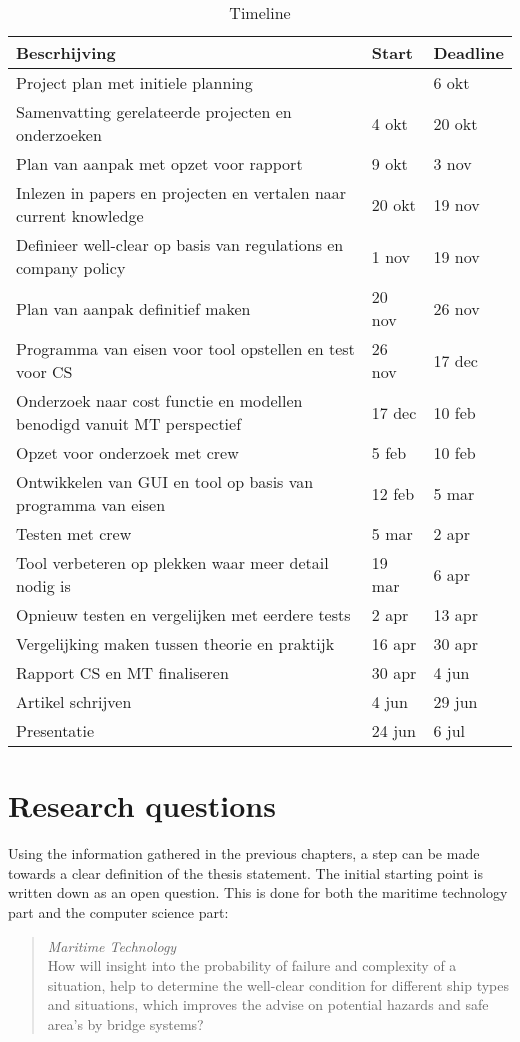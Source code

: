 \begin{table}[h]
	\centering
	\caption{Timeline}
	\label{tab:timeline-project}
	\begin{tabular}{l||l|l}
		Bescrhijving & Start & Deadline \\ \hline \hline
		Project plan met initiele planning &  & 6 okt \\ \hline
		Samenvatting gerelateerde projecten en onderzoeken & 4 okt & 20 okt \\ \hline
		Plan van aanpak met opzet voor rapport & 9 okt & 3 nov \\ \hline
		Inlezen in papers en projecten en vertalen naar current knowledge & 20 okt & 19 nov \\ \hline
		Definieer well-clear op basis van regulations en company policy & 1 nov & 19 nov \\ \hline
		Plan van aanpak definitief maken & 20 nov & 26 nov \\ \hline
		Programma van eisen voor tool opstellen en test voor CS & 26 nov & 17 dec \\ \hline
		Onderzoek naar cost functie en modellen benodigd vanuit MT perspectief & 17 dec & 10 feb \\ \hline
		Opzet voor onderzoek met crew & 5 feb & 10 feb \\ \hline
		Ontwikkelen van GUI en tool op basis van programma van eisen & 12 feb & 5 mar \\ \hline
		Testen met crew & 5 mar & 2 apr \\ \hline
		Tool verbeteren op plekken waar meer detail nodig is & 19 mar & 6 apr \\ \hline
		Opnieuw testen en vergelijken met eerdere tests & 2 apr & 13 apr \\ \hline
		Vergelijking maken tussen theorie en praktijk & 16 apr & 30 apr \\ \hline
		Rapport CS en MT finaliseren & 30 apr & 4 jun \\ \hline
		Artikel schrijven & 4 jun & 29 jun \\ \hline
		Presentatie & 24 jun & 6 jul
	\end{tabular}
\end{table}

\section{Research questions}
Using the information gathered in the previous chapters, a step can be made towards a clear definition of the thesis statement. The initial starting point is written down as an open question. This is done for both the maritime technology part and the computer science part:
\begin{quote}
	\emph{Maritime Technology}\\
	How will insight into the probability of failure and complexity of a situation, help to determine the well-clear condition for different ship types and situations, which improves the advise on potential hazards and safe area's by bridge systems?
\end{quote}

